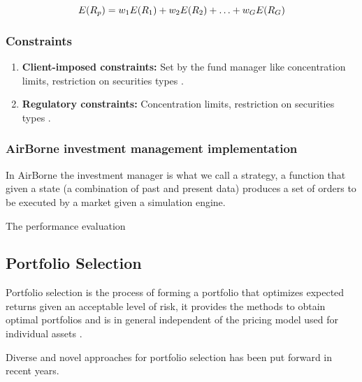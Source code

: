 \begin{equation}
    \label{eq::single_period_portfolio_expected_return}
    E(R_p) = w_1E(R_1)+w_2E(R_2)+\mathellipsis+w_GE(R_G)
\end{equation}



\subsubsection{Constraints}

\begin{enumerate}
    \item \textbf{Client-imposed constraints:} Set by the fund manager like concentration limits, restriction on securities types \cite{investment_management_book_2010}.
    \item \textbf{Regulatory constraints:} Concentration limits, restriction on securities types \cite{investment_management_book_2010}.
\end{enumerate}



\subsubsection{AirBorne investment management implementation}
In AirBorne the investment manager is what we call a strategy, a function that given a state (a combination of past and present data) produces a set of orders to be executed by a market given a simulation engine.

The performance evaluation

\subsection{Portfolio Selection}

Portfolio selection is the process of forming a portfolio that optimizes expected returns given an acceptable level of risk, it provides the methods to obtain optimal portfolios and is in general independent of the pricing model used for individual assets \cite{investment_management_book_2010}. 

Diverse and novel approaches for portfolio selection has been put forward in recent years.

